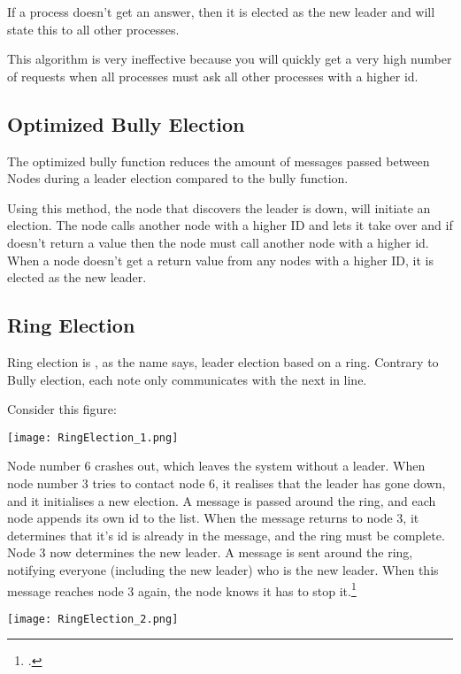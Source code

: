 If a process doesn't get an answer, then it is elected as the new leader and will state this to all other processes.

This algorithm is very ineffective because you will quickly get a very high number of requests when all processes must ask all other processes with a higher id.

\subsection{Optimized Bully Election}
The optimized bully function reduces the amount of messages passed between Nodes during a leader election compared to the bully function.

Using this method, the node that discovers the leader is down, will initiate an election. The node calls another node with a higher ID and lets it take over and if doesn't return a value then the node must call another node with a higher id. When a node doesn't get a return value from any nodes with a higher ID, it is elected as the new leader.

\subsection{Ring Election}
Ring election is , as the name says, leader election based on a ring. Contrary to Bully election, each note only communicates with the next in line.

Consider this figure:

\begin{center}
	\texttt{[image: RingElection\_1.png]}
\end{center}

Node number 6 crashes out, which leaves the system without a leader. When node number 3 tries to contact node 6, it realises that the leader has gone down, and it initialises a new election. A message is passed around the ring, and each node appends its own id to the list. When the message returns to node 3, it determines that it's id is already in the message, and the ring must be complete. Node 3 now determines the new leader. A message is sent around the ring, notifying everyone (including the new leader) who is the new leader. When this message reaches node 3 again, the node knows it has to stop it.\footcite{colostate_RingElec}

\begin{center}
	\texttt{[image: RingElection\_2.png]}
\end{center} 
